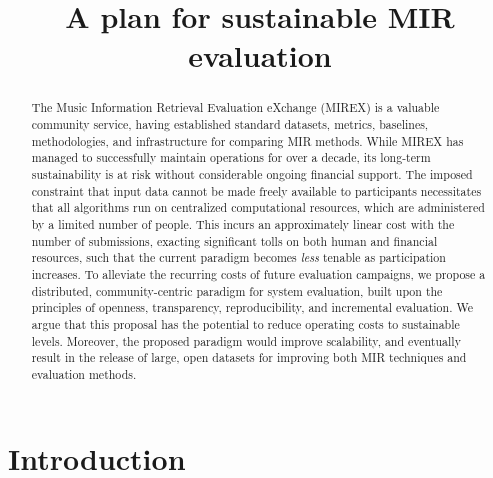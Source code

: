 \documentclass{article}
\title{A plan for sustainable MIR evaluation}
\begin{document}
%
\maketitle
%
\begin{abstract}
The Music Information Retrieval Evaluation eXchange (MIREX) is a valuable community service, having established standard datasets, metrics, baselines, methodologies, and infrastructure for comparing MIR methods. 
While MIREX has managed to successfully maintain operations for over a decade, its long-term sustainability is at risk without considerable ongoing financial support. 
The imposed constraint that input data cannot be made freely available to participants
necessitates that all algorithms run on centralized computational resources, which are 
administered by a limited number of people.
This incurs an approximately linear cost with the number of submissions, exacting
significant tolls on both human and financial resources, such that the current paradigm
becomes \emph{less} tenable as participation increases.
To alleviate the recurring costs of future evaluation campaigns, we propose a distributed,
community-centric paradigm for system evaluation, built upon the principles of openness,
transparency, reproducibility, and incremental evaluation.
We argue that this proposal has the potential to reduce operating costs to sustainable
levels.
Moreover, the proposed paradigm would improve scalability, and eventually result in the
release of large, open datasets for improving both MIR techniques and evaluation methods.

\end{abstract}
%

\section{Introduction}
\end{document}
